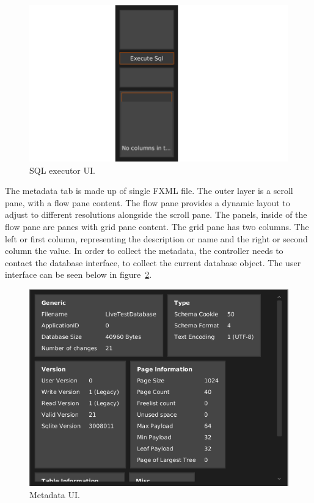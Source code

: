 \begin{figure}[H]
	\centering
	\includegraphics[scale=0.7]{images/ui_sqlexe_design_final.png}
	\caption{SQL executor UI.}
	\label{fig:ui_imp_sqlexe}
\end{figure}

The metadata tab is made up of single FXML file. The outer layer is a scroll pane, with a flow pane content. The flow pane provides a dynamic layout to adjust to different resolutions alongside the scroll pane. The panels, inside of the flow pane are panes with grid pane content. The grid pane has two columns. The left or first column, representing the description or name and the right or second column the value. In order to collect the metadata, the controller needs to contact the database interface, to collect the current database object. The user interface can be seen below in figure~\ref{fig:ui_imp_metdata}.

\begin{figure}[H]
	\centering
	\includegraphics[scale=0.32]{images/ui_meatadata_final.png}
	\caption{Metadata UI.}
	\label{fig:ui_imp_metdata}
\end{figure}

